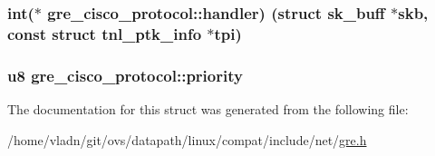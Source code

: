 \subsubsection[{handler}]{\setlength{\rightskip}{0pt plus 5cm}int($\ast$ gre\+\_\+cisco\+\_\+protocol\+::handler) (struct sk\+\_\+buff $\ast$skb, const struct {\bf tnl\+\_\+ptk\+\_\+info} $\ast$tpi)}\label{structgre__cisco__protocol_a8722aaef2209a2681ed04072b9f0f38b}
\hypertarget{structgre__cisco__protocol_a3617a7910af354dccd32e3eb24794975}{}
\subsubsection[{priority}]{\setlength{\rightskip}{0pt plus 5cm}u8 gre\+\_\+cisco\+\_\+protocol\+::priority}\label{structgre__cisco__protocol_a3617a7910af354dccd32e3eb24794975}


The documentation for this struct was generated from the following file\+:\begin{DoxyCompactItemize}
\item 
/home/vladn/git/ovs/datapath/linux/compat/include/net/\hyperlink{gre_8h}{gre.\+h}\end{DoxyCompactItemize}
